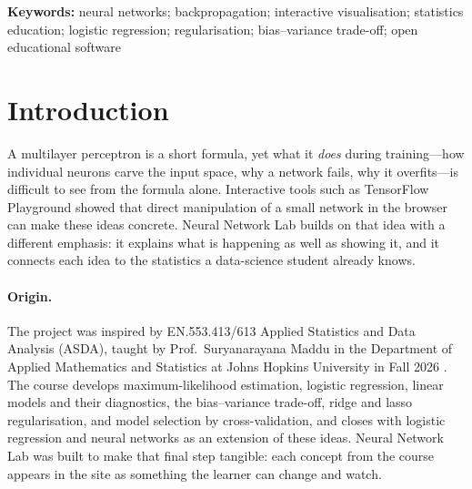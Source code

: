 \documentclass[11pt,a4paper]{article}
\newcommand{\courseName}{EN.553.413/613 Applied Statistics and Data Analysis (ASDA)}
\newcommand{\profName}{Prof.\ Suryanarayana Maddu}
\begin{document}
\noindent\textbf{Keywords:} neural networks; backpropagation; interactive visualisation; statistics education; logistic regression; regularisation; bias--variance trade-off; open educational software

\section{Introduction}

A multilayer perceptron is a short formula, yet what it \emph{does} during training---how individual neurons carve the input space, why a network fails, why it overfits---is difficult to see from the formula alone. Interactive tools such as TensorFlow Playground \citep{smilkov2017playground} showed that direct manipulation of a small network in the browser can make these ideas concrete. Neural Network Lab \citep{nnlab} builds on that idea with a different emphasis: it explains what is happening as well as showing it, and it connects each idea to the statistics a data-science student already knows.

\paragraph{Origin.} The project was inspired by \courseName{}, taught by \profName{} in the Department of Applied Mathematics and Statistics at Johns Hopkins University in Fall 2026 \citep{asda2026}. The course develops maximum-likelihood estimation, logistic regression, linear models and their diagnostics, the bias--variance trade-off, ridge and lasso regularisation, and model selection by cross-validation, and closes with logistic regression and neural networks as an extension of these ideas. Neural Network Lab was built to make that final step tangible: each concept from the course appears in the site as something the learner can change and watch.
\end{document}
